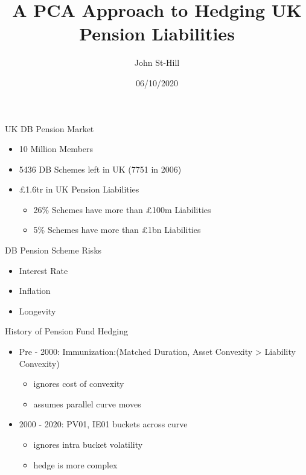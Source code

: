 \documentclass[ignorenonframetext,]{beamer}
\title{A PCA Approach to Hedging UK Pension Liabilities}
\author{John St-Hill}
\date{06/10/2020}
\providecommand{\tightlist}{%
  \setlength{\itemsep}{0pt}\setlength{\parskip}{0pt}}
\begin{document}
\frame{\titlepage}

\begin{frame}{UK DB Pension Market}
\protect\hypertarget{uk-db-pension-market}{}

\begin{itemize}
\tightlist
\item
  10 Million Members
\item
  5436 DB Schemes left in UK (7751 in 2006)
\item
  £1.6tr in UK Pension Liabilities

  \begin{itemize}
  \tightlist
  \item
    26\% Schemes have more than £100m Liabilities
  \item
    5\% Schemes have more than £1bn Liabilities
  \end{itemize}
\end{itemize}

\end{frame}

\begin{frame}{DB Pension Scheme Risks}
\protect\hypertarget{db-pension-scheme-risks}{}

\begin{itemize}
\tightlist
\item
  Interest Rate
\item
  Inflation
\item
  Longevity
\end{itemize}

\end{frame}

\begin{frame}{History of Pension Fund Hedging}
\protect\hypertarget{history-of-pension-fund-hedging}{}

\begin{itemize}
\tightlist
\item
  Pre - 2000: Immunization:(Matched Duration, Asset Convexity
  \textgreater{} Liability Convexity)

  \begin{itemize}
  \tightlist
  \item
    ignores cost of convexity
  \item
    assumes parallel curve moves
  \end{itemize}
\item
  2000 - 2020: PV01, IE01 buckets across curve

  \begin{itemize}
  \tightlist
  \item
    ignores intra bucket volatility
  \item
    hedge is more complex
  \end{itemize}
\end{itemize}

\end{frame}
\end{document}
